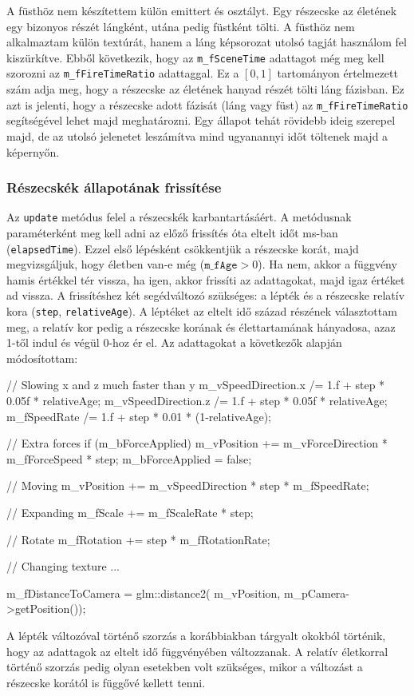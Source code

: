 A füsthöz nem készítettem külön emittert és osztályt. Egy részecske az életének egy bizonyos részét lángként, utána pedig füstként tölti. A füsthöz nem alkalmaztam külön textúrát, hanem a láng képsorozat utolsó tagját használom fel kiszürkítve. Ebből következik, hogy az \texttt{m\_fSceneTime} adattagot még meg kell szorozni az \texttt{m\_fFireTimeRatio} adattaggal. Ez a $[0, 1]$ tartományon értelmezett szám adja meg, hogy a részecske az életének hanyad részét tölti láng fázisban. Ez azt is jelenti, hogy a részecske adott fázisát (láng vagy füst) az \texttt{m\_fFireTimeRatio} segítségével lehet majd meghatározni. Egy állapot tehát rövidebb ideig szerepel majd, de az utolsó jelenetet leszámítva mind ugyanannyi időt töltenek majd a képernyőn. 

\subsubsection{Részecskék állapotának frissítése}
Az \texttt{update} metódus felel a részecskék karbantartásáért. A metódusnak paraméterként meg kell adni az előző frissítés óta eltelt időt ms-ban (\texttt{elapsedTime}). Ezzel első lépésként csökkentjük a részecske korát, majd megvizsgáljuk, hogy életben van-e még ($\texttt{m\_fAge} > 0$). Ha nem, akkor a függvény hamis értékkel tér vissza, ha igen, akkor frissíti az adattagokat, majd igaz értéket ad vissza. A frissítéshez két segédváltozó szükséges: a lépték és a részecske relatív kora (\texttt{step}, \texttt{relativeAge}). A léptéket az eltelt idő század részének választottam meg, a relatív kor pedig a részecske korának és élettartamának hányadosa, azaz 1-től indul és végül 0-hoz ér el. Az adattagokat a következők alapján módosítottam: 
\begin{cpp}
// Slowing x and z much faster than y
m_vSpeedDirection.x /= 1.f + step * 0.05f * relativeAge;
m_vSpeedDirection.z /= 1.f + step * 0.05f * relativeAge;
m_fSpeedRate /= 1.f + step * 0.01 * (1-relativeAge);

// Extra forces
if (m_bForceApplied)
{
	m_vPosition += m_vForceDirection * m_fForceSpeed * step;
	m_bForceApplied = false;
}

// Moving
m_vPosition += m_vSpeedDirection * step * m_fSpeedRate;

// Expanding
m_fScale += m_fScaleRate * step;

// Rotate
m_fRotation += step * m_fRotationRate;

// Changing texture
{...}

m_fDistanceToCamera = glm::distance2(
		m_vPosition, m_pCamera->getPosition());
\end{cpp}
A lépték változóval történő szorzás a korábbiakban tárgyalt okokból történik, hogy az adattagok az eltelt idő függvényében változzanak. A relatív életkorral történő szorzás pedig olyan esetekben volt szükséges, mikor a változást a részecske korától is függővé kellett tenni.

